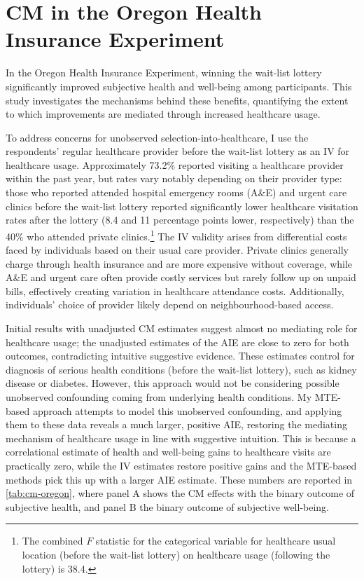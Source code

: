 \section{CM in the Oregon Health Insurance Experiment}
\label{sec:oregon}
In the Oregon Health Insurance Experiment, winning the wait-list lottery significantly improved subjective health and well-being among participants. 
This study investigates the mechanisms behind these benefits, quantifying the extent to which improvements are mediated through increased healthcare usage.

To address concerns for unobserved selection-into-healthcare, I use the respondents' regular healthcare provider before the wait-list lottery as an IV for healthcare usage.
Approximately 73.2\% reported visiting a healthcare provider within the past year, but rates vary notably depending on their provider type: those who reported attended hospital emergency rooms (A\&E) and urgent care clinics before the wait-list lottery reported significantly lower healthcare visitation rates after the lottery (8.4 and 11 percentage points lower, respectively) than the 40\% who attended private clinics.\footnote{
    The combined $F$ statistic for the categorical variable for healthcare usual location (before the wait-list lottery) on healthcare usage (following the lottery) is 38.4.
}
The IV validity arises from differential costs faced by individuals based on their usual care provider.
Private clinics generally charge through health insurance and are more expensive without coverage, while A\&E and urgent care often provide costly services but rarely follow up on unpaid bills, effectively creating variation in healthcare attendance costs.
Additionally, individuals' choice of provider likely depend on neighbourhood-based access.

Initial results with unadjusted CM estimates suggest almost no mediating role for healthcare usage; the unadjusted estimates of the AIE are close to zero for both outcomes, contradicting intuitive suggestive evidence.
These estimates control for diagnosis of serious health conditions (before the wait-list lottery), such as kidney disease or diabetes.
However, this approach would not be considering possible unobserved confounding coming from underlying health conditions.
My MTE-based approach attempts to model this unobserved confounding, and applying them to these data reveals a much larger, positive AIE, restoring the mediating mechanism of healthcare usage in line with suggestive intuition.
This is because a correlational estimate of health and well-being gains to healthcare visits are practically zero, while the IV estimates restore positive gains and the MTE-based methods pick this up with a larger AIE estimate.
These numbers are reported in \autoref{tab:cm-oregon}, where panel A shows the CM effects with the binary outcome of subjective health, and panel B the binary outcome of subjective well-being.

